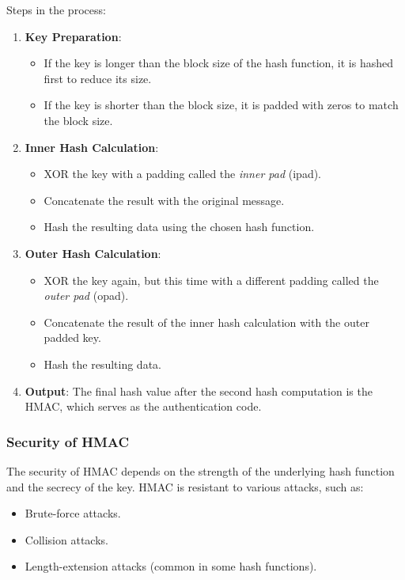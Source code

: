 Steps in the process:
\begin{enumerate}
  \item \textbf{Key Preparation}:
  \begin{itemize}
    \item If the key is longer than the block size of the hash function, it is hashed first to reduce its size.
    \item If the key is shorter than the block size, it is padded with zeros to match the block size.
  \end{itemize}
  
  \item \textbf{Inner Hash Calculation}:
  \begin{itemize}
    \item XOR the key with a padding called the \textit{inner pad} (ipad).
    \item Concatenate the result with the original message.
    \item Hash the resulting data using the chosen hash function.
  \end{itemize}
  
  \item \textbf{Outer Hash Calculation}:
  \begin{itemize}
    \item XOR the key again, but this time with a different padding called the \textit{outer pad} (opad).
    \item Concatenate the result of the inner hash calculation with the outer padded key.
    \item Hash the resulting data.
  \end{itemize}
  
  \item \textbf{Output}: The final hash value after the second hash computation is the HMAC, which serves as the authentication code.
\end{enumerate}

\subsubsection{Security of HMAC}
The security of HMAC depends on the strength of the underlying hash function and the secrecy of the key. HMAC is resistant to various attacks, such as:
\begin{itemize}
  \item Brute-force attacks.
  \item Collision attacks.
  \item Length-extension attacks (common in some hash functions).
\end{itemize}

